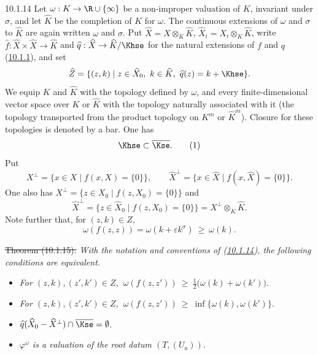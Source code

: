 \documentclass[12pt,a4paper,oneside,english]{smfart}
\makeatletter
\newcommand{\btanchor}[1]{\leavevmode\Hy@raisedlink{\hypertarget{bt:#1}{}}}
\newcommand{\btref}[1]{\hyperlink{bt:#1}{#1}}
\theoremstyle{definition}
\theoremstyle{bt}
\makeatother
\begin{document}
\num{10.1.14}\btanchor{10.1.14} Let $\omega:K\to\R\cup\{\infty\}$ be a non-improper valuation of
$K$, invariant under $\sigma$, and let $\widehat K$ be the completion of $K$ for
$\omega$. The continuous extensions of $\omega$ and $\sigma$ to $\widehat K$ are
again written $\omega$ and $\sigma$. Put
$\widehat X=X\otimes_K\widehat K$, $\widehat X_i=X_i\otimes_K\widehat K$, write
$\widehat f:\widehat X\times\widehat X\to\widehat K$ and
$\widehat q:\widehat X\to\widehat K/\Khse$ for the natural extensions of $f$ and
$q$ (\btref{10.1.1}), and set
\[
\widehat Z=\{(z,k)\mid z\in\widehat X_0,\ k\in\widehat K,\
\widehat q(z)=k+\Khse\}.
\]
We equip $K$ and $\widehat K$ with the topology defined by $\omega$, and every
finite-dimensional vector space over $K$ or $\widehat K$ with the topology
naturally associated with it (the topology transported from the product topology
on $K^{m}$ or $\widehat K^{m}$). Closure for these topologies is denoted by a
bar. One has
\begin{equation}
\Khse\subset\overline{\Kse}. \tag{1}
\end{equation}
Put
\[
X^{\perp}=\{x\in X\mid f(x,X)=\{0\}\},\qquad
\widehat X^{\perp}=\{x\in\widehat X\mid f(x,\widehat X)=\{0\}\}.
\]
One also has $X^{\perp}=\{z\in X_0\mid f(z,X_0)=\{0\}\}$ and
\begin{equation}
\widehat X^{\perp}=\{z\in\widehat X_0\mid f(z,X_0)=\{0\}\}
 =X^{\perp}\otimes_K\widehat K. \tag{2}
\end{equation}
Note further that, for $(z,k)\in Z$,
\begin{equation}
\omega(f(z,z))=\omega(k+\varepsilon k^{\sigma})\ \ge\ \omega(k). \tag{3}
\end{equation}

\st{Theorem (10.1.15).}
\emph{With the notation and conventions of (\btref{10.1.14}), the following conditions
are equivalent.}
\begin{itemize}
\item[(i)] \emph{For $(z,k),(z',k')\in Z$,}
 $\ \omega(f(z,z'))\ \ge\ \tfrac12\bigl(\omega(k)+\omega(k')\bigr).$
\item[(ii)] \emph{For $(z,k),(z',k')\in Z$,}
 $\ \omega(f(z,z'))\ \ge\ \inf\{\omega(k),\omega(k')\}.$
\item[(iii)] $\widehat q(\widehat X_0-\widehat X^{\perp})\cap\overline{\Kse}=\emptyset$.
\item[(iv)] \emph{$\varphi^{\omega}$ is a valuation of the root datum
$(T,(U_a))$.}
\end{itemize}
\end{document}
